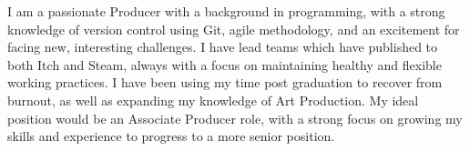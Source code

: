

\begin{cvparagraph}
    I am a passionate Producer with a background in programming, with a strong knowledge of version control using Git, agile methodology, and an excitement for facing new, interesting challenges. I have lead teams which have published to both Itch and Steam, always with a focus on maintaining healthy and flexible working practices. I have been using my time post graduation to recover from burnout, as well as expanding my knowledge of Art Production. My ideal position would be an Associate Producer role, with a strong focus on growing my skills and experience to progress to a more senior position.
\end{cvparagraph}
